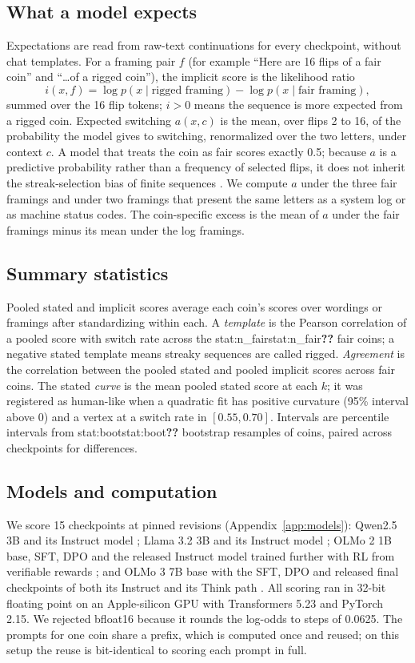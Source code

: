 \documentclass[11pt]{article}
\newcommand{\stat}[1]{\ifcsname stat:#1\endcsname\csname stat:#1\endcsname\else\textbf{??}\fi}
\begin{document}
\subsection{What a model expects}
Expectations are read from raw-text continuations for every checkpoint, without chat templates. For a framing pair $f$ (for example ``Here are 16 flips of a fair coin'' and ``\ldots of a rigged coin''), the implicit score is the likelihood ratio
\[
i(x, f) = \log p(x \mid \text{rigged framing}) - \log p(x \mid \text{fair framing}),
\]
summed over the 16 flip tokens; $i > 0$ means the sequence is more expected from a rigged coin. Expected switching $a(x, c)$ is the mean, over flips 2 to 16, of the probability the model gives to switching, renormalized over the two letters, under context $c$. A model that treats the coin as fair scores exactly 0.5; because $a$ is a predictive probability rather than a frequency of selected flips, it does not inherit the streak-selection bias of finite sequences \citep{miller2018surprised}. We compute $a$ under the three fair framings and under two framings that present the same letters as a system log or as machine status codes. The coin-specific excess is the mean of $a$ under the fair framings minus its mean under the log framings.

\subsection{Summary statistics}
Pooled stated and implicit scores average each coin's scores over wordings or framings after standardizing within each. A \emph{template} is the Pearson correlation of a pooled score with switch rate across the \stat{n_fair} fair coins; a negative stated template means streaky sequences are called rigged. \emph{Agreement} is the correlation between the pooled stated and pooled implicit scores across fair coins. The stated \emph{curve} is the mean pooled stated score at each $k$; it was registered as human-like when a quadratic fit has positive curvature (95\% interval above 0) and a vertex at a switch rate in $[0.55, 0.70]$. Intervals are percentile intervals from \stat{boot} bootstrap resamples of coins, paired across checkpoints for differences.

\subsection{Models and computation}
We score 15 checkpoints at pinned revisions (Appendix~\ref{app:models}): Qwen2.5 3B and its Instruct model \citep{qwen2024qwen25}; Llama 3.2 3B and its Instruct model \citep{grattafiori2024llama}; OLMo 2 1B base, SFT, DPO and the released Instruct model trained further with RL from verifiable rewards \citep{olmo2024olmo2,lambert2024tulu,rafailov2023direct}; and OLMo 3 7B base with the SFT, DPO and released final checkpoints of both its Instruct and its Think path \citep{olmo2025olmo3}. All scoring ran in 32-bit floating point on an Apple-silicon GPU with Transformers 5.23 and PyTorch 2.15. We rejected bfloat16 because it rounds the log-odds to steps of 0.0625. The prompts for one coin share a prefix, which is computed once and reused; on this setup the reuse is bit-identical to scoring each prompt in full.
\end{document}
